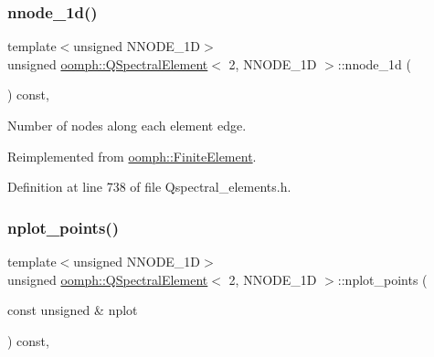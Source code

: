 \subsubsection{\texorpdfstring{nnode\+\_\+1d()}{nnode\_1d()}}
{\footnotesize\ttfamily template$<$unsigned N\+N\+O\+D\+E\+\_\+1D$>$ \\
unsigned \hyperlink{classoomph_1_1QSpectralElement}{oomph\+::\+Q\+Spectral\+Element}$<$ 2, N\+N\+O\+D\+E\+\_\+1D $>$\+::nnode\+\_\+1d (\begin{DoxyParamCaption}{ }\end{DoxyParamCaption}) const\hspace{0.3cm}{\ttfamily [inline]}, {\ttfamily [virtual]}}



Number of nodes along each element edge. 



Reimplemented from \hyperlink{classoomph_1_1FiniteElement_ab65c7a94dda80c1876a09ac12be4e39c}{oomph\+::\+Finite\+Element}.



Definition at line 738 of file Qspectral\+\_\+elements.\+h.

\mbox{\label{classoomph_1_1QSpectralElement_3_012_00_01NNODE__1D_01_4_ab722b0fd6c021708567af9c1d3de34be}} 
\subsubsection{\texorpdfstring{nplot\+\_\+points()}{nplot\_points()}}
{\footnotesize\ttfamily template$<$unsigned N\+N\+O\+D\+E\+\_\+1D$>$ \\
unsigned \hyperlink{classoomph_1_1QSpectralElement}{oomph\+::\+Q\+Spectral\+Element}$<$ 2, N\+N\+O\+D\+E\+\_\+1D $>$\+::nplot\+\_\+points (\begin{DoxyParamCaption}\item[{const unsigned \&}]{nplot }\end{DoxyParamCaption}) const\hspace{0.3cm}{\ttfamily [inline]}, {\ttfamily [virtual]}}



